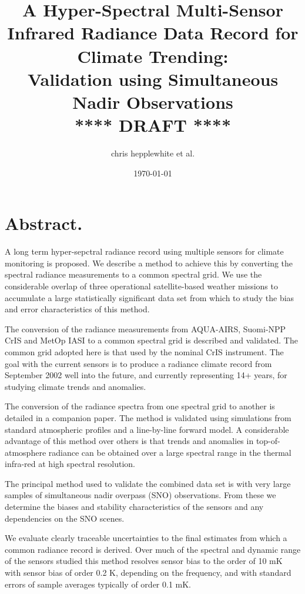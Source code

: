 \documentclass[11pt]{article}
\author{chris hepplewhite et al.}
\date{\today}
\title{A Hyper-Spectral Multi-Sensor Infrared Radiance Data Record for Climate Trending: \\  
  Validation using Simultaneous Nadir Observations \\  
  \vspace{3mm}
  {****} DRAFT {****}\\
}
\begin{document}
\maketitle

\tableofcontents

\section{Abstract.}
\label{sec:orgheadline1}

A long term hyper-sepctral radiance record using multiple sensors for climate monitoring is proposed. We describe a method to achieve this by converting the spectral radiance measurements to a common spectral grid. We use the considerable overlap of three operational satellite-based weather missions to accumulate a large statistically significant data set from which to study the bias and error characteristics of this method.


The conversion of the radiance measurements from AQUA-AIRS, Suomi-NPP CrIS and MetOp IASI to a common spectral grid is described and validated. The common grid adopted here is that used by the nominal CrIS instrument. The goal with the current sensors is to produce a radiance climate record from September 2002 well into the future, and currently representing 14+ years, for studying climate trends and anomalies.


The conversion of the radiance spectra from one spectral grid to another is detailed in a companion paper. The method is validated using simulations from standard atmospheric profiles and a line-by-line forward model. A considerable advantage of this method over others is that trends and anomalies in top-of-atmosphere radiance can be obtained over a large spectral range in the thermal infra-red at high spectral resolution.

The principal method used to validate the combined data set is with very large samples of simultaneous nadir overpass (SNO) observations. From these we determine the biases and stability characteristics of the sensors and any dependencies on the SNO scenes.

We evaluate clearly traceable uncertainties to the final estimates from which a common radiance record is derived. Over much of the spectral and dynamic range of the sensors studied this method resolves sensor bias to the order of 10 mK with sensor bias of order 0.2 K, depending on the frequency, and with standard errors of sample averages typically of order 0.1 mK. 
\end{document}
